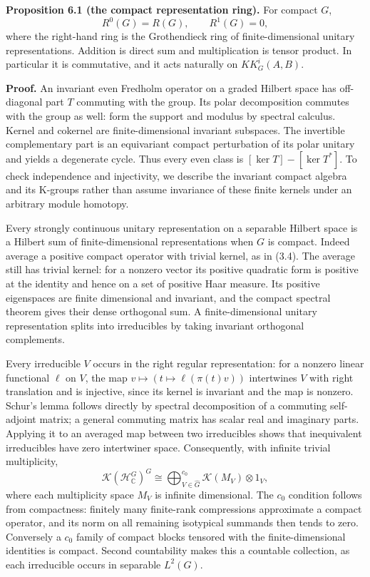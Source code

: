 \documentclass[
  11pt,
]{article}
\begin{document}
\textbf{Proposition 6.1 (the compact representation ring).} For compact
\(G\), \[
R^0(G)=R(G),\qquad R^1(G)=0,
\tag{6.2}
\] where the right-hand ring is the Grothendieck ring of
finite-dimensional unitary representations. Addition is direct sum and
multiplication is tensor product. In particular it is commutative, and
it acts naturally on \(KK_G^i(A,B)\).

\textbf{Proof.} An invariant even Fredholm operator on a graded Hilbert
space has off-diagonal part \(T\) commuting with the group. Its polar
decomposition commutes with the group as well: form the support and
modulus by spectral calculus. Kernel and cokernel are finite-dimensional
invariant subspaces. The invertible complementary part is an equivariant
compact perturbation of its polar unitary and yields a degenerate cycle.
Thus every even class is \([
\ker T]-[\ker T^*]\). To check independence and injectivity, we describe
the invariant compact algebra and its K-groups rather than assume
invariance of these finite kernels under an arbitrary module homotopy.

Every strongly continuous unitary representation on a separable Hilbert
space is a Hilbert sum of finite-dimensional representations when \(G\)
is compact. Indeed average a positive compact operator with trivial
kernel, as in (3.4). The average still has trivial kernel: for a nonzero
vector its positive quadratic form is positive at the identity and hence
on a set of positive Haar measure. Its positive eigenspaces are finite
dimensional and invariant, and the compact spectral theorem gives their
dense orthogonal sum. A finite-dimensional unitary representation splits
into irreducibles by taking invariant orthogonal complements.

Every irreducible \(V\) occurs in the right regular representation: for
a nonzero linear functional \(\ell\) on \(V\), the map
\(v\mapsto(t\mapsto\ell(\pi(t)v))\) intertwines \(V\) with right
translation and is injective, since its kernel is invariant and the map
is nonzero. Schur's lemma follows directly by spectral decomposition of
a commuting self-adjoint matrix; a general commuting matrix has scalar
real and imaginary parts. Applying it to an averaged map between two
irreducibles shows that inequivalent irreducibles have zero intertwiner
space. Consequently, with infinite trivial multiplicity, \[
\mathcal K(\mathcal H_{\mathbb C}^G)^G
 \cong\bigoplus_{V\in\widehat G}^{c_0}
 \mathcal K(M_V)\otimes1_V,
\tag{6.3}
\] where each multiplicity space \(M_V\) is infinite dimensional. The
\(c_0\) condition follows from compactness: finitely many finite-rank
compressions approximate a compact operator, and its norm on all
remaining isotypical summands then tends to zero. Conversely a \(c_0\)
family of compact blocks tensored with the finite-dimensional identities
is compact. Second countability makes this a countable collection, as
each irreducible occurs in separable \(L^2(G)\).
\end{document}
